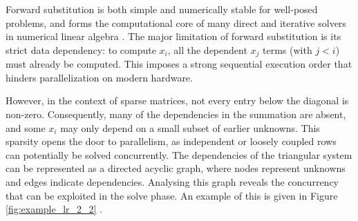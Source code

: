 Forward substitution is both simple and numerically stable for well-posed problems, and forms the computational core of many direct and iterative solvers in numerical linear algebra \cite{10.1007/978-3-031-64850-2_42}. The major limitation of forward substitution is its strict data dependency: to compute $x_i$, all the dependent $x_j$ terms (with $j<i$) must already be computed. This imposes a strong sequential execution order that hinders parallelization on modern hardware.

However, in the context of sparse matrices, not every entry below the diagonal is non-zero. Consequently, many of the dependencies in the summation are absent, and some $x_i$ may only depend on a small subset of earlier unknowns. This sparsity opens the door to parallelism, as independent or loosely coupled rows can potentially be solved concurrently.
The dependencies of the triangular system can be represented as a directed acyclic graph, where nodes represent unknowns and edges indicate dependencies. Analysing this graph reveals the concurrency that can be exploited in the solve phase. An example of this is given in Figure \ref{fig:example_lr_2_2} \cite{10.1007/978-3-319-07518-1_8}.

